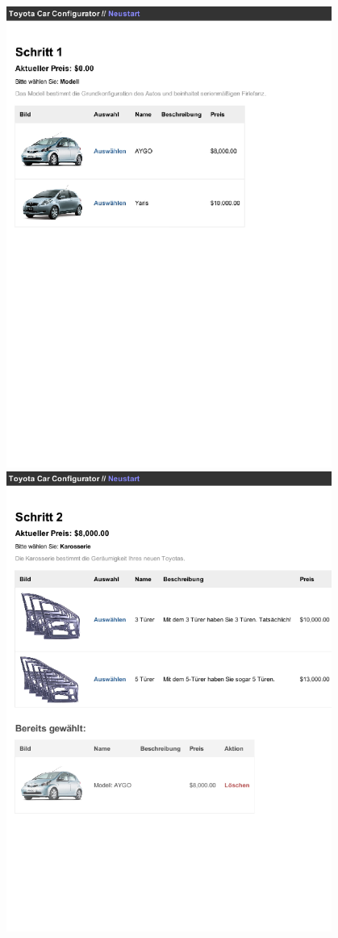 \documentclass[a4paper,10pt]{article}
\begin{document}
\includegraphics[width=0.8\textwidth]{screenshots/screenshot1.png}
\\
\includegraphics[width=0.8\textwidth]{screenshots/screenshot2.png}
\end{document}
